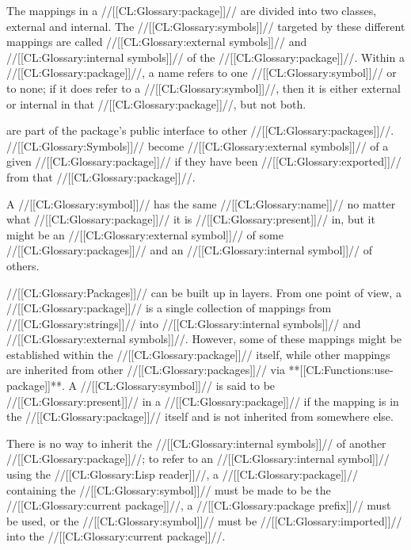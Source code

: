 \endsubsubsection%



The mappings in a //[[CL:Glossary:package]]// are divided into two classes, external and internal. The //[[CL:Glossary:symbols]]// targeted by these different mappings  are called //[[CL:Glossary:external symbols]]// and //[[CL:Glossary:internal symbols]]// of the //[[CL:Glossary:package]]//. Within a //[[CL:Glossary:package]]//, a name refers to one //[[CL:Glossary:symbol]]// or to none; if it does refer to a //[[CL:Glossary:symbol]]//, then it is either external or internal in that //[[CL:Glossary:package]]//, but not both.

 are part of the package's public interface to other //[[CL:Glossary:packages]]//. //[[CL:Glossary:Symbols]]// become //[[CL:Glossary:external symbols]]// of a given //[[CL:Glossary:package]]// if they have been //[[CL:Glossary:exported]]// from that //[[CL:Glossary:package]]//.

A //[[CL:Glossary:symbol]]// has the same //[[CL:Glossary:name]]// no matter what //[[CL:Glossary:package]]//  it is //[[CL:Glossary:present]]// in, but it might be an //[[CL:Glossary:external symbol]]// of some //[[CL:Glossary:packages]]// and an //[[CL:Glossary:internal symbol]]// of others. 

\endsubsubsubsection%


//[[CL:Glossary:Packages]]// can be built up in layers.  From one point of view, a //[[CL:Glossary:package]]// is a single collection of mappings from //[[CL:Glossary:strings]]// into //[[CL:Glossary:internal symbols]]// and  //[[CL:Glossary:external symbols]]//. However, some of these mappings might be established within the //[[CL:Glossary:package]]//  itself, while other mappings are inherited from other //[[CL:Glossary:packages]]//  via **[[CL:Functions:use-package]]**. A //[[CL:Glossary:symbol]]// is said to be //[[CL:Glossary:present]]// in a //[[CL:Glossary:package]]//  if the mapping is in the //[[CL:Glossary:package]]// itself and is not inherited from somewhere else.

There is no way to inherit the //[[CL:Glossary:internal symbols]]// of another //[[CL:Glossary:package]]//; to refer to an //[[CL:Glossary:internal symbol]]// using the //[[CL:Glossary:Lisp reader]]//, 
    a //[[CL:Glossary:package]]// containing the //[[CL:Glossary:symbol]]// 
     must be made to be the //[[CL:Glossary:current package]]//,
    a //[[CL:Glossary:package prefix]]// must be used,
 or the //[[CL:Glossary:symbol]]// must be //[[CL:Glossary:imported]]// into the //[[CL:Glossary:current package]]//.

